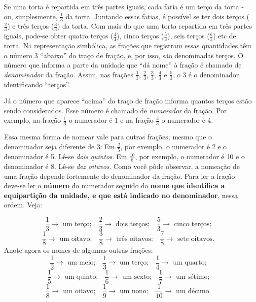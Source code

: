 Se uma torta é repartida em três partes iguais, cada fatia é um terço da torta - ou, simplesmente, $\frac{1}{3}$ da torta. Juntando essas fatias, é possível se ter dois terços ($\frac{2}{3}$) e três terços ($\frac{3}{3}$) da torta. Com mais do que uma torta repartida em três partes iguais, pode-se obter quatro terços ($\frac{4}{3}$), cinco terços ($\frac{5}{3}$), seis terços ($\frac{6}{3}$) etc de torta. Na representação simbólica, as frações que registram essas quantidades têm o número 3 ``abaixo'' do traço de fração, e, por isso, são denominadas terços. O número que informa a parte da unidade que ``dá nome'' à fração é chamado de {\it denominador} da fração. Assim, nas frações $\frac{1}{3}$, $\frac{2}{3}$, $\frac{3}{3}$,  $\frac{4}{3}$ e $\frac{5}{3}$, o 3 é o denominador, identificando ``terços''. 

Já o número que aparece ``acima'' do traço de fração informa quantos terços estão sendo considerados. Esse número é chamado de {\it numerador} da fração. Por exemplo, na fração $\frac{1}{3}$ o numerador é 1 e na fração $\frac{4}{3}$ o numerador é 4.

Essa mesma forma de nomear vale para outras frações, mesmo que o denominador seja diferente de 3: \newline 
Em $\frac{2}{5}$, por exemplo, o numerador é 2 e o denominador é 5. Lê-se {\it dois quintos}.\newline 
Em $\frac{10}{8}$, por exemplo, o numerador é 10 e o denominador é 8. Lê-se {\it dez oitavos}. \newline 
Como você pôde observar, a nomeação de uma fração depende fortemente do denominador da fração. Para ler a fração deve-se ler o {\bf número} do numerador seguido do {\bf nome que identifica a equipartição da unidade, e que está indicado no denominador}, nessa ordem. Veja:

$$\frac{1}{3}\rightarrow \text{ um terço;} \quad \frac{2}{3}\rightarrow \text{ dois terços;} \quad \frac{5}{3}\rightarrow \text{ cinco terços;}$$
$$\frac{1}{8}\rightarrow \text{ um oitavo;} \quad \frac{3}{8}\rightarrow \text{ três oitavos;} \quad \frac{7}{8}\rightarrow \text{ sete oitavos.}$$
Anote agora os nomes de algumas outras frações:
$$\frac{1}{2}\rightarrow \text{  um meio;} \quad \frac{1}{3}\rightarrow\text{  um terço;} \quad \frac{1}{4}\rightarrow\text{  um quarto;}$$
$$\frac{1}{5}\rightarrow\text{  um quinto;}\quad \frac{1}{6}\rightarrow\text{  um sexto;} \quad \frac{1}{7}\rightarrow\text{  um sétimo;}$$
$$\frac{1}{8}\rightarrow\text{  um oitavo;}\quad \frac{1}{9}\rightarrow\text{  um nono;}\quad \frac{1}{10}\rightarrow\text{  um décimo.}$$

